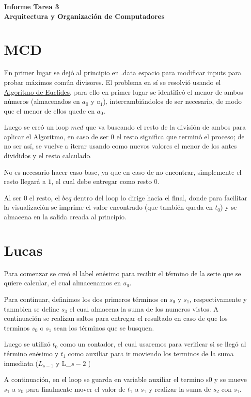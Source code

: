 \documentclass[11pt,letterpaper]{article}
\newcommand{\titulo}{Informe Tarea 3 \\ Arquitectura y Organización de Computadores}
\renewcommand{\maketitle}
{
\thispagestyle{fancy}
\begin{center}
\begin{Large}
\textbf{\titulo}\\
\end{Large}
\end{center}
\vspace{0.3cm}
}
\begin{document}
\setcounter{secnumdepth}{0}
\maketitle
\section{MCD}
En primer lugar se dejó al principio en .data espacio para modificar inputs para probar máximos común divisores. El problema en sí se resolvió usando el \href{https://es.wikipedia.org/wiki/Algoritmo_de_Euclides#Algoritmo_de_Euclides_tradicional}{Algoritmo de Euclides}, para ello en primer lugar se identificó el menor de ambos números (almacenados en $a_0$ y $a_1$), intercambiándolos de ser necesario, de modo que el menor de ellos quede en $a_0$. 

Luego se creó un loop $mcd$ que va buscando el resto de la división de ambos para aplicar el Algoritmo, en caso de ser $0$ el resto significa que terminó el proceso; de no ser así, se vuelve a iterar usando como nuevos valores el menor de los antes divididos y el resto calculado.

No es necesario hacer caso base, ya que en caso de no encontrar, simplemente el resto llegará a $1$, el cual debe entregar como resto $0$.

Al ser $0$ el resto, el $beq$ dentro del loop lo dirige hacia el final, donde para facilitar la visualización se imprime el valor encontrado (que también queda en $t_0$) y se almacena en la salida creada al principio. 

\section{Lucas}
Para comenzar se creó el label enésimo para recibir el término de la serie que se quiere calcular, el cual almacenamos en $a_0$. 

Para continuar, definimos los dos primeros términos en $s_0$ y $s_1$, respectivamente y tanmbien se define $s_3$ el cual almacena la suma de los numeros vistos. A continuación se realizan saltos para entregar el resultado en caso de que los terminos $s_0$ o $s_1$ sean los términos que se busquen.

Luego se utilizó $t_0$ como un contador, el cual usaremos para verificar si se llegó al término enésimo y $t_1$ como auxiliar para ir moviendo los terminos de la suma inmediata ($L_{s-1}$ y L_${s-2}$  )

A continuación, en el loop se guarda en variable auxiliar el termino s0 y se mueve  $s_1$ a  $s_0$ para finalmente mover el valor de  $t_1$ a  $s_1$ y realizar la suma de  $s_2$ con  $s_1$.
\end{document}
